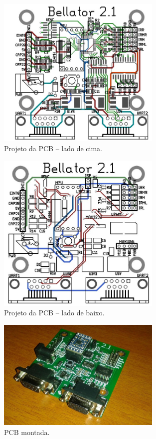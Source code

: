 \begin{figure}[H]
  \centering
  \includegraphics[width=0.7\textwidth, keepaspectratio]{./figuras/hardware/pcb_cima.jpg}
  \caption{Projeto da PCB -- lado de cima.}
  \label{fig:pcb_cima}
\end{figure}

\begin{figure}[H]
  \centering
  \includegraphics[width=0.7\textwidth, keepaspectratio]{./figuras/hardware/pcb_baixo.jpg}
  \caption{Projeto da PCB -- lado de baixo.}
  \label{fig:pcb_baixo}
\end{figure}

\begin{figure}[H]
  \centering
  \includegraphics[width=0.7\textwidth, keepaspectratio]{./figuras/hardware/pcb_pronta.jpg}
  \caption{PCB montada.}
  \label{fig:pcb_pronta}
\end{figure}

